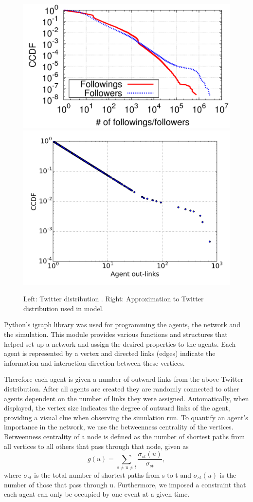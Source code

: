 \documentclass [12pt,a4paper,twoside]{article}
\begin{document}
\begin{figure}[h!]
  \centering
  \includegraphics[width=0.45\linewidth]{report/Twitter_real_distr}
  \includegraphics[width=0.54\linewidth]{report/Out-link_Distribution2}
  \caption{Left: Twitter distribution \cite{twitter-distribution-real}. Right: Approximation to Twitter distribution used in model.}
  \label{twitter_distr}
\end{figure}

Python's igraph library was used for programming the agents, the network and the simulation. This module provides various functions and structures that helped set up a network and assign the desired properties to the agents. Each agent is represented by a vertex and directed links (edges) indicate the information and interaction direction between these vertices.

Therefore each agent is given a number of outward links from the above Twitter distribution. After all agents are created they are randomly connected to other agents dependent on the number of links they were assigned. Automatically, when displayed, the vertex size indicates the degree of outward links of the agent, providing a visual clue when observing the simulation run. To quantify an agent's importance in the network, we use the betweenness centrality of the vertices. Betweenness centrality of a node is defined as the number of shortest paths from all vertices to all others that pass through that node, given as
\begin{equation}
g(u) = \sum_{s\neq u\neq t} \frac{\sigma_{st}(u)}{\sigma_{st}},
\end{equation}
where $\sigma_{st}$ is the total number of shortest paths from s to t and $\sigma_{st}(u)$ is the number of those that pass through u. Furthermore, we imposed a constraint that each agent can only be occupied by one event at a given time.
\end{document}
